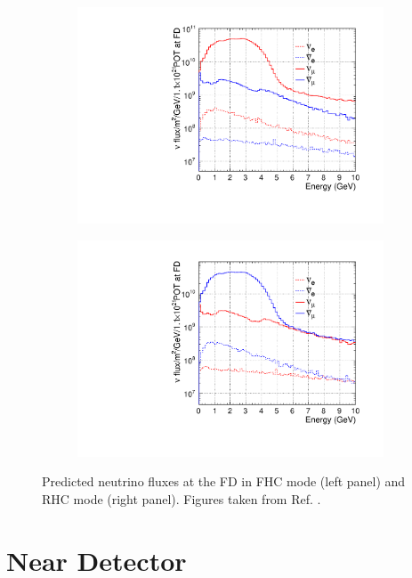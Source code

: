 \begin{figure}[h!]
	\begin{subfigure}{0.49\textwidth}
		\centering
		\includegraphics[width=.99\linewidth]{Images/DUNE/LBNF/dune_neutrino_fd_log}
	\end{subfigure}
	\begin{subfigure}{0.49\textwidth}
		\centering
		\includegraphics[width=.99\linewidth]{Images/DUNE/LBNF/dune_antineutrino_fd_log}
	\end{subfigure}
	\caption[Predicted neutrino fluxes at the FD in FHC mode and RHC mode.]{Predicted neutrino fluxes at the FD in FHC mode (left panel) and RHC mode (right panel). Figures taken from Ref. \cite{DUNE2020TDR2}.}
	\label{fig:dune_fd_flux}
\end{figure}

\section{Near Detector}

